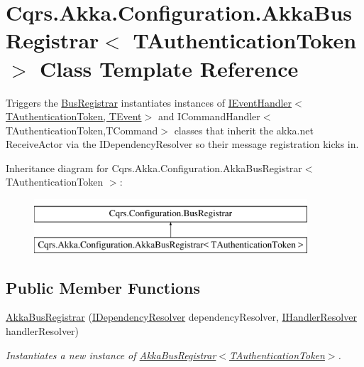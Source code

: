 \hypertarget{classCqrs_1_1Akka_1_1Configuration_1_1AkkaBusRegistrar}{}\section{Cqrs.\+Akka.\+Configuration.\+Akka\+Bus\+Registrar$<$ T\+Authentication\+Token $>$ Class Template Reference}
\label{classCqrs_1_1Akka_1_1Configuration_1_1AkkaBusRegistrar}


Triggers the \hyperlink{classCqrs_1_1Configuration_1_1BusRegistrar_a4a934d21a535b28af6c67154512bba20_a4a934d21a535b28af6c67154512bba20}{Bus\+Registrar} instantiates instances of \hyperlink{interfaceCqrs_1_1Events_1_1IEventHandler}{I\+Event\+Handler$<$\+T\+Authentication\+Token, T\+Event$>$} and I\+Command\+Handler$<$\+T\+Authentication\+Token,\+T\+Command$>$ classes that inherit the akka.\+net Receive\+Actor via the I\+Dependency\+Resolver so their message registration kicks in.  


Inheritance diagram for Cqrs.\+Akka.\+Configuration.\+Akka\+Bus\+Registrar$<$ T\+Authentication\+Token $>$\+:\begin{figure}[H]
\begin{center}
\leavevmode
\includegraphics[height=2.000000cm]{classCqrs_1_1Akka_1_1Configuration_1_1AkkaBusRegistrar}
\end{center}
\end{figure}
\subsection*{Public Member Functions}
\begin{DoxyCompactItemize}
\item 
\hyperlink{classCqrs_1_1Akka_1_1Configuration_1_1AkkaBusRegistrar_a49ab48e3305b6eb17f2a68fc2996a988_a49ab48e3305b6eb17f2a68fc2996a988}{Akka\+Bus\+Registrar} (\hyperlink{interfaceCqrs_1_1Configuration_1_1IDependencyResolver}{I\+Dependency\+Resolver} dependency\+Resolver, \hyperlink{interfaceCqrs_1_1Akka_1_1Configuration_1_1IHandlerResolver}{I\+Handler\+Resolver} handler\+Resolver)
\begin{DoxyCompactList}\small\item\em Instantiates a new instance of \hyperlink{classCqrs_1_1Akka_1_1Configuration_1_1AkkaBusRegistrar_a49ab48e3305b6eb17f2a68fc2996a988_a49ab48e3305b6eb17f2a68fc2996a988}{Akka\+Bus\+Registrar$<$\+T\+Authentication\+Token$>$}. \end{DoxyCompactList}\end{DoxyCompactItemize}
